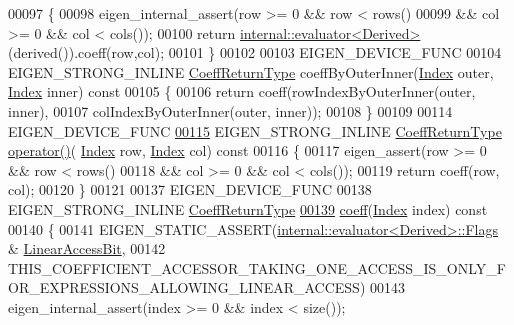 \begin{DoxyCode}
00097 \textcolor{keyword}{    }\{
00098       eigen\_internal\_assert(row >= 0 && row < rows()
00099                          && col >= 0 && col < cols());
00100       \textcolor{keywordflow}{return} \hyperlink{struct_eigen_1_1internal_1_1evaluator}{internal::evaluator<Derived>}(derived()).coeff(row,col);
00101     \}
00102 
00103     EIGEN\_DEVICE\_FUNC
00104     EIGEN\_STRONG\_INLINE \hyperlink{class_eigen_1_1internal_1_1_tensor_lazy_evaluator_writable}{CoeffReturnType} coeffByOuterInner(\hyperlink{group___core___module_a554f30542cc2316add4b1ea0a492ff02}{Index} outer, 
      \hyperlink{group___core___module_a554f30542cc2316add4b1ea0a492ff02}{Index} inner)\textcolor{keyword}{ const}
00105 \textcolor{keyword}{    }\{
00106       \textcolor{keywordflow}{return} coeff(rowIndexByOuterInner(outer, inner),
00107                    colIndexByOuterInner(outer, inner));
00108     \}
00109 
00114     EIGEN\_DEVICE\_FUNC
\hyperlink{group___core___module_a29ac34389e098ec963ebb2ebd351335a}{00115}     EIGEN\_STRONG\_INLINE \hyperlink{class_eigen_1_1internal_1_1_tensor_lazy_evaluator_writable}{CoeffReturnType} \hyperlink{group___core___module_a29ac34389e098ec963ebb2ebd351335a}{operator()}(
      \hyperlink{group___core___module_a554f30542cc2316add4b1ea0a492ff02}{Index} row, \hyperlink{group___core___module_a554f30542cc2316add4b1ea0a492ff02}{Index} col)\textcolor{keyword}{ const}
00116 \textcolor{keyword}{    }\{
00117       eigen\_assert(row >= 0 && row < rows()
00118           && col >= 0 && col < cols());
00119       \textcolor{keywordflow}{return} coeff(row, col);
00120     \}
00121 
00137     EIGEN\_DEVICE\_FUNC
00138     EIGEN\_STRONG\_INLINE \hyperlink{class_eigen_1_1internal_1_1_tensor_lazy_evaluator_writable}{CoeffReturnType}
\hyperlink{group___core___module_ad52344ad1f42852db71996590d2de0de}{00139}     \hyperlink{group___core___module_ad52344ad1f42852db71996590d2de0de}{coeff}(\hyperlink{group___core___module_a554f30542cc2316add4b1ea0a492ff02}{Index} index)\textcolor{keyword}{ const}
00140 \textcolor{keyword}{    }\{
00141       EIGEN\_STATIC\_ASSERT(\hyperlink{struct_eigen_1_1internal_1_1evaluator}{internal::evaluator<Derived>::Flags} & 
      \hyperlink{group__flags_ga4b983a15d57cd55806df618ac544d09e}{LinearAccessBit},
00142                           
      THIS\_COEFFICIENT\_ACCESSOR\_TAKING\_ONE\_ACCESS\_IS\_ONLY\_FOR\_EXPRESSIONS\_ALLOWING\_LINEAR\_ACCESS)
00143       eigen\_internal\_assert(index >= 0 && index < size());

\end{DoxyCode}
